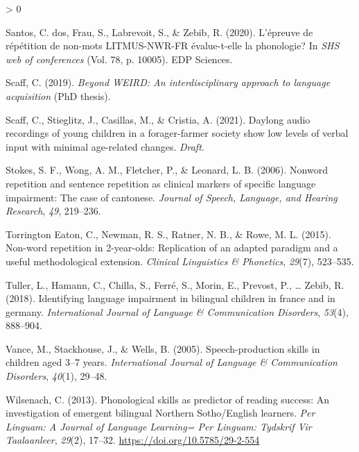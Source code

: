 \documentclass[
  english,
  ,man,floatsintext]{apa6}
\newlength{\cslhangindent}
\newenvironment{CSLReferences}[2] %
 {%
  \setlength{\parindent}{0pt}
  \ifodd #1 \everypar{\setlength{\hangindent}{\cslhangindent}}\ignorespaces\fi
  \ifnum #2 > 0
  \setlength{\parskip}{#2\baselineskip}
  \fi
 }%
 {}
\begin{document}
\begin{CSLReferences}{1}{0}
\leavevmode\hypertarget{ref-dos2020epreuve}{}%
Santos, C. dos, Frau, S., Labrevoit, S., \& Zebib, R. (2020). L'{é}preuve de r{é}p{é}tition de non-mots LITMUS-NWR-FR {é}value-t-elle la phonologie? In \emph{SHS web of conferences} (Vol. 78, p. 10005). EDP Sciences.

\leavevmode\hypertarget{ref-scaff2019}{}%
Scaff, C. (2019). \emph{Beyond {WEIRD}: An interdisciplinary approach to language acquisition} (PhD thesis).

\leavevmode\hypertarget{ref-scaff2021daylong}{}%
Scaff, C., Stieglitz, J., Casillas, M., \& Cristia, A. (2021). Daylong audio recordings of young children in a forager-farmer society show low levels of verbal input with minimal age-related changes. \emph{Draft}.

\leavevmode\hypertarget{ref-stokes2006nonword}{}%
Stokes, S. F., Wong, A. M., Fletcher, P., \& Leonard, L. B. (2006). Nonword repetition and sentence repetition as clinical markers of specific language impairment: The case of cantonese. \emph{Journal of Speech, Language, and Hearing Research}, \emph{49}, 219--236.

\leavevmode\hypertarget{ref-torrington2015non}{}%
Torrington Eaton, C., Newman, R. S., Ratner, N. B., \& Rowe, M. L. (2015). Non-word repetition in 2-year-olds: Replication of an adapted paradigm and a useful methodological extension. \emph{Clinical Linguistics \& Phonetics}, \emph{29}(7), 523--535.

\leavevmode\hypertarget{ref-tuller2018identifying}{}%
Tuller, L., Hamann, C., Chilla, S., Ferré, S., Morin, E., Prevost, P., \ldots{} Zebib, R. (2018). Identifying language impairment in bilingual children in france and in germany. \emph{International Journal of Language \& Communication Disorders}, \emph{53}(4), 888--904.

\leavevmode\hypertarget{ref-vance2005speech}{}%
Vance, M., Stackhouse, J., \& Wells, B. (2005). Speech-production skills in children aged 3--7 years. \emph{International Journal of Language \& Communication Disorders}, \emph{40}(1), 29--48.

\leavevmode\hypertarget{ref-wilsenach2013phonological}{}%
Wilsenach, C. (2013). {Phonological skills as predictor of reading success: An investigation of emergent bilingual Northern Sotho/English learners}. \emph{{Per Linguam: A Journal of Language Learning= Per Linguam: Tydskrif Vir Taalaanleer}}, \emph{29}(2), 17--32. \url{https://doi.org/10.5785/29-2-554}

\end{CSLReferences}
\end{document}
